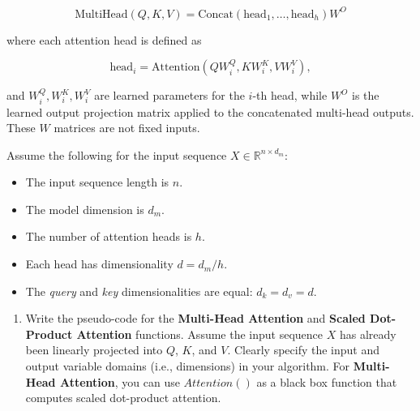 \documentclass[12pt,a4paper]{article}
\theoremstyle{definition}
\begin{document}
\begin{enumerate}
    \begin{equation}
        \text{MultiHead}(Q, K, V) =
        \text{Concat}(\text{head}_1, \dots, \text{head}_h) W^O
    \end{equation}
    
    where each attention head is defined as
    
    \begin{equation}
        \text{head}_i = 
        \text{Attention}(QW_i^Q, KW_i^K, VW_i^V),
    \end{equation}
    
    and $W_i^Q, W_i^K, W_i^V$ are learned parameters for the $i$-th head, while $W^O$ is the learned output projection matrix applied to the concatenated multi-head outputs. These $W$ matrices are not fixed inputs.
    
    Assume the following for the input sequence \(X \in \mathbb{R}^{n \times d_m}\):
    \begin{itemize}
        \item The input sequence length is $n$.
        \item The model dimension is $d_{m}$.
        \item The number of attention heads is $h$.
        \item Each head has dimensionality $d = d_{m}/h$.
        \item The \textit{query} and \textit{key} dimensionalities are equal: $d_k = d_v = d$.
    \end{itemize}
        
    \begin{enumerate}
        \item Write the pseudo-code for the \textbf{Multi-Head Attention} and \textbf{Scaled Dot-Product Attention} functions. Assume the input sequence $X$ has already been linearly projected into $Q$, $K$, and $V$. Clearly specify the input and output variable domains (i.e., dimensions) in your algorithm. For \textbf{Multi-Head Attention}, you can use $Attention()$ as a black box function that computes scaled dot-product attention.

            \begin{algorithm}[H]
                \LinesNumbered
                \BlankLine
                \caption{Scaled Dot-Product Attention} \label{attention}
                

\end{algorithm}
\end{enumerate}
\end{enumerate}
\end{document}

